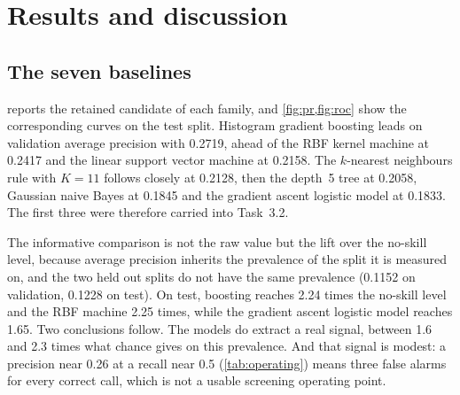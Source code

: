 
\section{Results and discussion}
\label{sec:results}

\subsection{The seven baselines}
\label{sec:results-baselines}

 reports the retained candidate of each family, and
\cref{fig:pr,fig:roc} show the corresponding curves on the test split.
Histogram gradient boosting leads on validation average precision with
\num{0.2719}, ahead of the RBF kernel machine at \num{0.2417} and the linear
support vector machine at \num{0.2158}. The $k$-nearest neighbours rule with
$K=11$ follows closely at \num{0.2128}, then the depth~5 tree at \num{0.2058},
Gaussian naive Bayes at \num{0.1845} and the gradient ascent logistic model at
\num{0.1833}. The first three were therefore carried into Task~3.2.

\begin{table}[t]
  \centering
  \caption{The seven baselines on the primary seed. Each row is the candidate of
  its family with the highest validation average precision; the test columns are
  computed once, after that choice. The score type is \emph{prob.} when the
  ranking metrics come from \texttt{predict\_proba} and \emph{margin} when they
  come from \texttt{decision\_function}. Accuracy, precision, recall and F1 are
  taken at each family's default cut-off, which \cref{sec:results-operating}
  shows to be the wrong reading of this task.}
  \label{tab:baselines}
  \footnotesize\setlength{\tabcolsep}{4.5pt}
  
\end{table}

The informative comparison is not the raw value but the lift over the no-skill
level, because average precision inherits the prevalence of the split it is
measured on, and the two held out splits do not have the same prevalence
(\num{0.1152} on validation, \num{0.1228} on test). On test, boosting reaches
\num{2.24} times the no-skill level and the RBF machine \num{2.25} times, while
the gradient ascent logistic model reaches \num{1.65}. Two conclusions follow.
The models do extract a real signal, between \num{1.6} and \num{2.3} times what
chance gives on this prevalence. And that signal is modest: a precision near
\num{0.26} at a recall near \num{0.5} (\cref{tab:operating}) means three false
alarms for every correct call, which is not a usable screening operating point.

